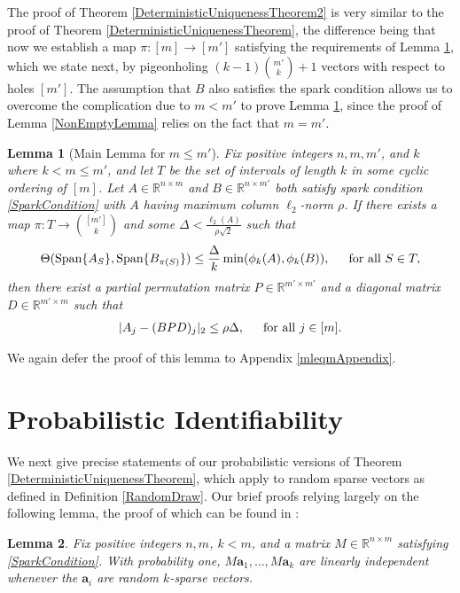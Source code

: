 \documentclass[journal, onecolumn]{IEEEtran}
\newtheorem{lemma}{Lemma}
\begin{document}
The proof of Theorem \ref{DeterministicUniquenessTheorem2} is very similar to the proof of Theorem \ref{DeterministicUniquenessTheorem}, the difference being that now we establish a map $\pi: [m] \to [m']$ satisfying the requirements of Lemma \ref{MainLemma2}, which we state next, by pigeonholing $(k-1){m' \choose k} + 1$ vectors with respect to holes $[m']$. The assumption that $B$ also satisfies the spark condition allows us to overcome the complication due to $m < m'$ to prove Lemma \ref{MainLemma2}, since the proof of Lemma \ref{NonEmptyLemma} relies on the fact that $m = m'$. 

\begin{lemma}[Main Lemma for $m \leq m'$]\label{MainLemma2}
Fix positive integers $n, m, m'$, and $k$ where $k < m \leq m'$, and let $T$ be the set of intervals of length $k$ in some cyclic ordering of $[m]$. Let $A \in \mathbb{R}^{n \times m}$ and $B \in \mathbb{R}^{n \times m'}$ both satisfy spark condition \eqref{SparkCondition} with $A$ having maximum column $\ell_2$-norm $\rho$. If there exists a map $\pi: T \to {[m'] \choose k}$ and some $\Delta < \frac{\ell_{2}(A)}{\rho \sqrt{2}}$ such that 
\begin{equation}\label{GapUpperBound2}
\Theta(\text{\rm Span}\{A_{S}\}, \text{\rm Span}\{B_{\pi(S)}\}) \leq \frac{ \Delta }{k} \min(\phi_k(A), \phi_k(B)), \indent \text{for all } S \in T,
\end{equation}
%
then there exist a partial permutation matrix $P \in \mathbb{R}^{m' \times m'}$ and a diagonal matrix $D \in \mathbb{R}^{m' \times m}$ such that
\begin{align}
|A_j - (BPD)_j|_2 \leq \rho \Delta, \indent \text{for all } j \in [m].
\end{align}
\end{lemma}

We again defer the proof of this lemma to Appendix \ref{mleqmAppendix}.



\section{Probabilistic Identifiability}\label{PUT}

We next give precise statements of our probabilistic versions of Theorem \ref{DeterministicUniquenessTheorem}, which apply to random sparse vectors as defined in Definition \ref{RandomDraw}. Our brief proofs relying largely on the following lemma, the proof of which can be found in \cite[Lemma 3]{Hillar15}:
\begin{lemma}\label{Hillar15lemma2}
Fix positive integers $n, m$, $k < m$, and a matrix $M \in \mathbb{R}^{n \times m}$ satisfying \eqref{SparkCondition}. With probability one, $M\mathbf{a}_1, \ldots, M\mathbf{a}_k$ are linearly independent whenever the $\mathbf{a}_i$ are random $k$-sparse vectors.
\end{lemma}
\end{document}

